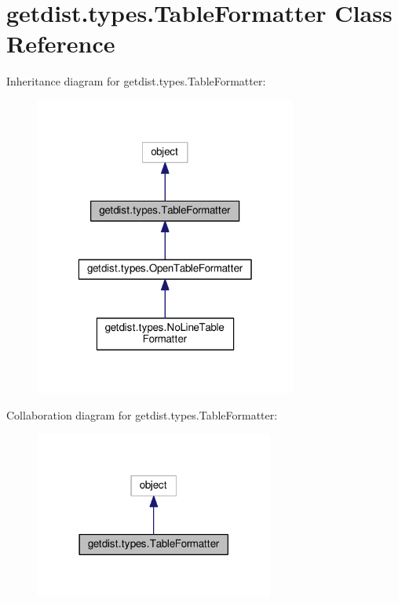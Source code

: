 \hypertarget{classgetdist_1_1types_1_1TableFormatter}{}\section{getdist.\+types.\+Table\+Formatter Class Reference}
\label{classgetdist_1_1types_1_1TableFormatter}


Inheritance diagram for getdist.\+types.\+Table\+Formatter\+:
\nopagebreak
\begin{figure}[H]
\begin{center}
\leavevmode
\includegraphics[width=244pt]{classgetdist_1_1types_1_1TableFormatter__inherit__graph}
\end{center}
\end{figure}


Collaboration diagram for getdist.\+types.\+Table\+Formatter\+:
\nopagebreak
\begin{figure}[H]
\begin{center}
\leavevmode
\includegraphics[width=222pt]{classgetdist_1_1types_1_1TableFormatter__coll__graph}
\end{center}
\end{figure}
